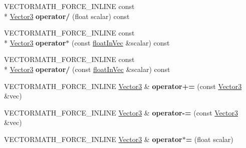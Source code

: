 \begin{DoxyCompactItemize}
\item 
\hypertarget{class_vectormath_1_1_aos_1_1_vector3_a7a3516596e6cab823886963ccf9149bd}{V\+E\+C\+T\+O\+R\+M\+A\+T\+H\+\_\+\+F\+O\+R\+C\+E\+\_\+\+I\+N\+L\+I\+N\+E const \\*
\hyperlink{class_vectormath_1_1_aos_1_1_vector3}{Vector3} {\bfseries operator/} (float scalar) const }\label{class_vectormath_1_1_aos_1_1_vector3_a7a3516596e6cab823886963ccf9149bd}

\item 
\hypertarget{class_vectormath_1_1_aos_1_1_vector3_a0855873417d7f400412d4280a79f5c3a}{V\+E\+C\+T\+O\+R\+M\+A\+T\+H\+\_\+\+F\+O\+R\+C\+E\+\_\+\+I\+N\+L\+I\+N\+E const \\*
\hyperlink{class_vectormath_1_1_aos_1_1_vector3}{Vector3} {\bfseries operator$\ast$} (const \hyperlink{class_vectormath_1_1float_in_vec}{float\+In\+Vec} \&scalar) const }\label{class_vectormath_1_1_aos_1_1_vector3_a0855873417d7f400412d4280a79f5c3a}

\item 
\hypertarget{class_vectormath_1_1_aos_1_1_vector3_a97419a17ad052fb71fbf3776d589186b}{V\+E\+C\+T\+O\+R\+M\+A\+T\+H\+\_\+\+F\+O\+R\+C\+E\+\_\+\+I\+N\+L\+I\+N\+E const \\*
\hyperlink{class_vectormath_1_1_aos_1_1_vector3}{Vector3} {\bfseries operator/} (const \hyperlink{class_vectormath_1_1float_in_vec}{float\+In\+Vec} \&scalar) const }\label{class_vectormath_1_1_aos_1_1_vector3_a97419a17ad052fb71fbf3776d589186b}

\item 
\hypertarget{class_vectormath_1_1_aos_1_1_vector3_a8789262444893a359053014901735479}{V\+E\+C\+T\+O\+R\+M\+A\+T\+H\+\_\+\+F\+O\+R\+C\+E\+\_\+\+I\+N\+L\+I\+N\+E \hyperlink{class_vectormath_1_1_aos_1_1_vector3}{Vector3} \& {\bfseries operator+=} (const \hyperlink{class_vectormath_1_1_aos_1_1_vector3}{Vector3} \&vec)}\label{class_vectormath_1_1_aos_1_1_vector3_a8789262444893a359053014901735479}

\item 
\hypertarget{class_vectormath_1_1_aos_1_1_vector3_a20c40d65588b8cd944563e7ccfbfc0cd}{V\+E\+C\+T\+O\+R\+M\+A\+T\+H\+\_\+\+F\+O\+R\+C\+E\+\_\+\+I\+N\+L\+I\+N\+E \hyperlink{class_vectormath_1_1_aos_1_1_vector3}{Vector3} \& {\bfseries operator-\/=} (const \hyperlink{class_vectormath_1_1_aos_1_1_vector3}{Vector3} \&vec)}\label{class_vectormath_1_1_aos_1_1_vector3_a20c40d65588b8cd944563e7ccfbfc0cd}

\item 
\hypertarget{class_vectormath_1_1_aos_1_1_vector3_a6e6f042308c5088cbdf3d30c24a9e80f}{V\+E\+C\+T\+O\+R\+M\+A\+T\+H\+\_\+\+F\+O\+R\+C\+E\+\_\+\+I\+N\+L\+I\+N\+E \hyperlink{class_vectormath_1_1_aos_1_1_vector3}{Vector3} \& {\bfseries operator$\ast$=} (float scalar)}\label{class_vectormath_1_1_aos_1_1_vector3_a6e6f042308c5088cbdf3d30c24a9e80f}


\end{DoxyCompactItemize}
